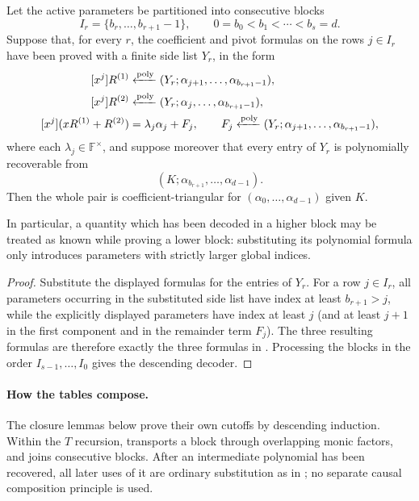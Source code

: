 \begin{lemma}
\label{lem:triangular-block-concatenation}
Let the active parameters be partitioned into consecutive blocks
\[
  I_r=\{b_r,\ldots,b_{r+1}-1\},\qquad
  0=b_0<b_1<\cdots<b_s=d.
\]
Suppose that, for every $r$, the coefficient and pivot formulas on the rows
$j\in I_r$ have been proved with a finite side list $Y_r$, in the form
\[
\begin{aligned}
 [x^j]R^{(1)}&\polyfrom
   (Y_r;\alpha_{j+1},\ldots,\alpha_{b_{r+1}-1}),\\
 [x^j]R^{(2)}&\polyfrom
   (Y_r;\alpha_j,\ldots,\alpha_{b_{r+1}-1}),\\
 [x^j](xR^{(1)}+R^{(2)})
   &=\lambda_j\alpha_j+F_j,
 \qquad F_j\polyfrom
   (Y_r;\alpha_{j+1},\ldots,\alpha_{b_{r+1}-1}),
\end{aligned}
\]
where each $\lambda_j\in\mathbb F^\times$, and suppose moreover that every
entry of $Y_r$ is polynomially recoverable from
\[
       (K;\alpha_{b_{r+1}},\ldots,\alpha_{d-1}).
\]
Then the whole pair is coefficient-triangular for
$(\alpha_0,\ldots,\alpha_{d-1})$ given $K$.

In particular, a quantity which has been decoded in a higher block may be
treated as known while proving a lower block: substituting its polynomial
formula only introduces parameters with strictly larger global indices.
\end{lemma}
\begin{proof}
Substitute the displayed formulas for the entries of $Y_r$.  For a row
$j\in I_r$, all parameters occurring in the substituted side list have
index at least $b_{r+1}>j$, while the explicitly displayed parameters have
index at least $j$ (and at least $j+1$ in the first component and in the
remainder term $F_j$).  The three resulting formulas are therefore exactly
the three formulas in .  Processing the
blocks in the order $I_{s-1},\ldots,I_0$ gives the descending decoder.
\end{proof}

\paragraph{How the tables compose.}
The closure lemmas below prove their own cutoffs by descending induction.
Within the $T$ recursion,  transports a block
through overlapping monic factors, and
 joins consecutive blocks.  After an
intermediate polynomial has been recovered, all later uses of it are ordinary
substitution as in ; no separate causal
composition principle is used.

